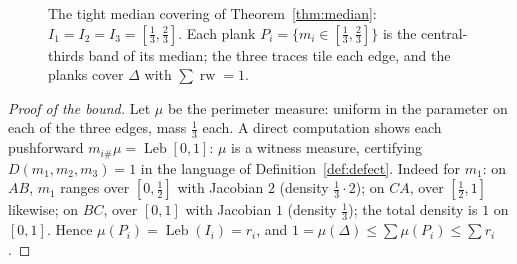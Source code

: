 \documentclass{aims}
\numberwithin{equation}{section}
\theoremstyle{plain}
\theoremstyle{definition}
\theoremstyle{remark}
\newcommand{\rw}{\operatorname{rw}}
\newcommand{\Leb}{\operatorname{Leb}}
\begin{document}
\begin{figure}[ht]
\centering
{}
\caption{The tight median covering of Theorem~\ref{thm:median}:
$I_1=I_2=I_3=[\tfrac13,\tfrac23]$. Each plank $P_i=\{m_i\in[\tfrac13,\tfrac23]\}$
is the central-thirds band of its median; the three traces tile each edge, and
the planks cover $\Delta$ with $\sum\rw=1$.}
\label{fig:median}
\end{figure}
\begin{proof}[Proof of the bound]
Let $\mu$ be the perimeter measure: uniform in the parameter on each of the three
edges, mass $\tfrac13$ each. A direct computation shows each pushforward
$m_{i\#}\mu=\Leb[0,1]$: $\mu$ is a witness measure, certifying
$D(m_1,m_2,m_3)=1$ in the language of Definition~\ref{def:defect}. Indeed for $m_1$: on $AB$, $m_1$ ranges over $[0,\tfrac12]$
with Jacobian $2$ (density $\tfrac13\cdot2$); on $CA$, over $[\tfrac12,1]$ likewise;
on $BC$, over $[0,1]$ with Jacobian $1$ (density $\tfrac13$); the total density is
$1$ on $[0,1]$. Hence $\mu(P_i)=\Leb(I_i)=r_i$,
and $1=\mu(\Delta)\le\sum\mu(P_i)\le\sum r_i$.
\end{proof}
\end{document}
